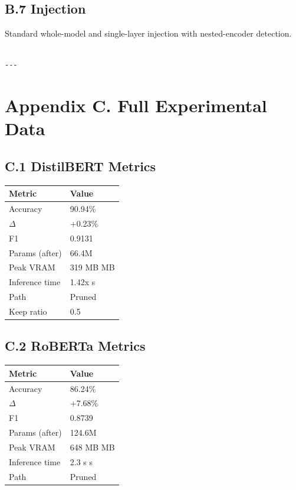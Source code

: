 \subsection{B.7 Injection}

Standard whole-model and single-layer injection with nested-encoder 
detection.
\begin{lstlisting}

---
\end{lstlisting}


\section{Appendix C. Full Experimental Data}

\subsection{C.1 DistilBERT Metrics}

\begin{table}[H]
\centering
\small
\begin{tabular}{ll}
\toprule
\textbf{Metric} & \textbf{Value} \\
\midrule
Accuracy & 90.94\% \\
$\Delta$ & +0.23\% \\
F1 & 0.9131 \\
Params (after) & 66.4M \\
Peak VRAM & 319 MB MB \\
Inference time & 1.42x s \\
Path & Pruned \\
Keep ratio & 0.5 \\
\bottomrule
\end{tabular}
\end{table}

\subsection{C.2 RoBERTa Metrics}

\begin{table}[H]
\centering
\small
\begin{tabular}{ll}
\toprule
\textbf{Metric} & \textbf{Value} \\
\midrule
Accuracy & 86.24\% \\
$\Delta$ & +7.68\% \\
F1 & 0.8739 \\
Params (after) & 124.6M \\
Peak VRAM & 648 MB MB \\
Inference time & 2.3 s s \\
Path & Pruned \\
\bottomrule
\end{tabular}
\end{table}

